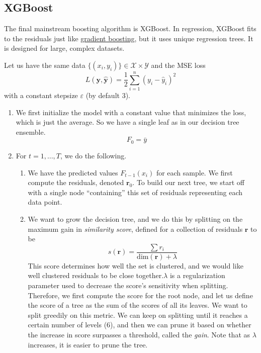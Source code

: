 \subsection{XGBoost} 

  The final mainstream boosting algorithm is XGBoost. In regression, XGBoost fits to the residuals just like \hyperref[def:gradient-boosting]{gradient boosting}, but it uses unique regression trees. It is designed for large, complex datasets. 

  \begin{definition}
    \label{def:xgboost-for-regression}
 
    Let us have the same data $\{(x_i, y_i)\} \in \mathcal{X} \times \mathcal{Y}$ and the MSE loss 
    \begin{equation}
      L(\mathbf{y}, \hat{\mathbf{y}}) = \frac{1}{2} \sum_{i=1}^n (y_i - \hat{y}_i)^2
    \end{equation}
    with a constant stepsize $\varepsilon$ (by default $3$). 

    \begin{enumerate}
      \item We first initialize the model with a constant value that minimizes the loss, which is just the average. So we have a single leaf as in our decision tree ensemble. 
        \begin{equation}
          F_0 = \bar{y}
        \end{equation}

      \item For $t = 1, \ldots, T$, we do the following. 
        \begin{enumerate}
          \item We have the predicted values $F_{t-1}(x_i)$ for each sample. We first compute the residuals, denoted $\mathbf{r}_0$. To build our next tree, we start off with a single node ``containing'' this set of residuals representing each data point. 

          \item We want to grow the decision tree, and we do this by splitting on the maximum gain in \textit{similarity score}, defined for a collection of residuals $\mathbf{r}$ to be 
          \begin{equation}
            s(\mathbf{r}) = \frac{\sum r_i}{\mathrm{dim}(\mathbf{r}) + \lambda}
          \end{equation}
          This score determines how well the set is clustered, and we would like well clustered residuals to be close together.$\lambda$ is a regularization parameter used to decrease the score's sensitivity when splitting. Therefore, we first compute the score for the root node, and let us define the score of a tree as the sum of the scores of all its leaves. We want to split greedily on this metric. We can keep on splitting until it reaches a certain number of levels (6), and then we can prune it based on whether the increase in score surpasses a threshold, called the \textit{gain}. Note that as $\lambda$ increases, it is easier to prune the tree. 


\end{enumerate}
\end{enumerate}
\end{definition}
